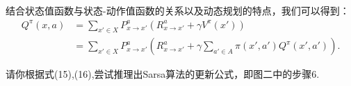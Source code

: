 \documentclass[answers]{exam}  %
\begin{document}
\begin{questions}
\begin{parts}
    \newpage
    结合状态值函数与状态-动作值函数的关系以及动态规划的特点，我们可以得到：
    \begin{align}
    Q^\pi(x, a) &= \sum_{x' \in X} P^a_{x \to x'} \left( R^a_{x \to x'} + \gamma V^\pi(x') \right) \\
    &= \sum_{x' \in X} P^a_{x \to x'} \left( R^a_{x \to x'} + \gamma \sum_{a' \in A} \pi(x', a') Q^\pi(x', a') \right).
    \end{align}

    请你根据式(15),(16),尝试推理出Sarsa算法的更新公式，即图二中的步骤6.


\end{parts}

\begin{solution}
\begin{parts}
	\part
	\part
        \part
\end{parts}
\end{solution}





\end{questions}
\end{document}
